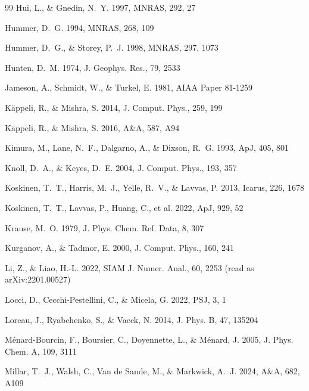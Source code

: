 \begin{thebibliography}{99}
Hui, L., \& Gnedin, N.~Y. 1997, MNRAS, 292, 27

Hummer, D.~G. 1994, MNRAS, 268, 109

Hummer, D.~G., \& Storey, P.~J. 1998, MNRAS, 297, 1073

Hunten, D.~M. 1974, J. Geophys. Res., 79, 2533

Jameson, A., Schmidt, W., \& Turkel, E. 1981, AIAA Paper 81-1259

K\"appeli, R., \& Mishra, S. 2014, J. Comput. Phys., 259, 199

K\"appeli, R., \& Mishra, S. 2016, A\&A, 587, A94

Kimura, M., Lane, N.~F., Dalgarno, A., \& Dixson, R.~G. 1993, ApJ, 405, 801

Knoll, D.~A., \& Keyes, D.~E. 2004, J. Comput. Phys., 193, 357

Koskinen, T.~T., Harris, M.~J., Yelle, R.~V., \& Lavvas, P. 2013,
Icarus, 226, 1678

Koskinen, T.~T., Lavvas, P., Huang, C., et al. 2022, ApJ, 929, 52

Krause, M.~O. 1979, J. Phys. Chem. Ref. Data, 8, 307

Kurganov, A., \& Tadmor, E. 2000, J. Comput. Phys., 160, 241

Li, Z., \& Liao, H.-L. 2022, SIAM J. Numer. Anal., 60, 2253
(read as arXiv:2201.00527)

Locci, D., Cecchi-Pestellini, C., \& Micela, G. 2022, PSJ, 3, 1

Loreau, J., Ryabchenko, S., \& Vaeck, N. 2014, J. Phys. B, 47, 135204

M\'enard-Bourcin, F., Boursier, C., Doyennette, L., \& M\'enard, J. 2005,
J. Phys. Chem. A, 109, 3111

Millar, T.~J., Walsh, C., Van de Sande, M., \& Markwick, A.~J. 2024, A\&A, 682, A109


\end{thebibliography}
